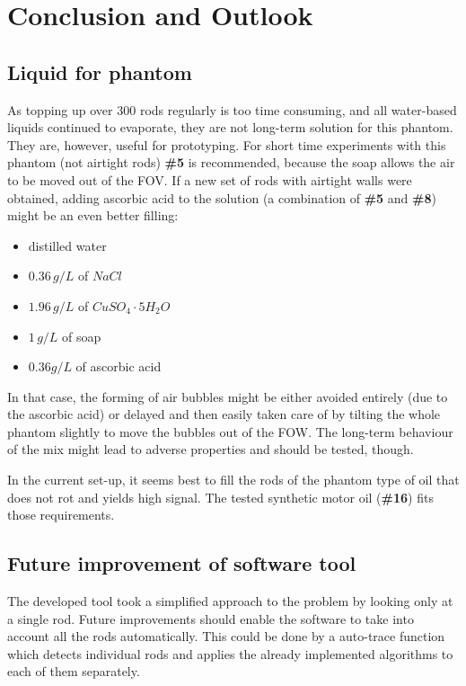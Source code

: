 
\chapter{Conclusion and Outlook}
\section{Liquid for phantom}

As topping up over 300 rods regularly is too time consuming, and all water-based liquids continued to evaporate, they are not long-term solution for this phantom.
They are, however, useful for prototyping.
For short time experiments with this phantom (not airtight rods) \textbf{\#5} is recommended, because the soap allows the air to be moved out of the FOV.
If a new set of rods with airtight walls were obtained, adding ascorbic acid to the solution (a combination of \textbf{\#5} and \textbf{\#8}) might be an even better filling:
\begin{itemize}
\item  distilled water
\item  $0.36 \, g/L$ of $NaCl$
\item  $1.96 \, g/L$ of $CuSO_4\cdot5H_2O$
\item  $1 \, g/L$ of soap
\item  $0.36 g/L$ of ascorbic acid
\end{itemize}
In that case, the forming of air bubbles might be either avoided entirely (due to the ascorbic acid) or delayed and then easily taken care of by tilting the whole phantom slightly to move the bubbles out of the FOW.
The long-term behaviour of the mix might lead to adverse properties and should be tested, though.

In the current set-up, it seems best to fill the rods of the phantom type of oil that does not rot and yields high signal.
The tested synthetic motor oil (\textbf{\#16}) fits those requirements.


    
\section{Future improvement of software tool}

The developed tool took a simplified approach to the problem by looking only at a single rod.
Future improvements should enable the software to take into account all the rods automatically.
This could be done by a auto-trace function which detects individual rods and applies the already implemented algorithms to each of them separately. 

